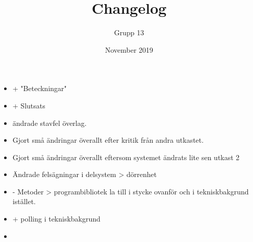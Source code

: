 \documentclass{article}
\title{Changelog}
\author{Grupp 13}
\date{November 2019}
\begin{document}
\maketitle
\begin{itemize}
    \item + "Beteckningar"
    \item + Slutsats
    \item ändrade stavfel överlag.
    \item Gjort små ändringar överallt efter kritik från andra utkastet. 
    \item Gjort små ändringar överallt eftersom systemet ändrats lite sen utkast 2
    \item Ändrade felsägningar i delsystem > dörrenhet
    \item - Metoder > programbibliotek la till i stycke ovanför och i tekniskbakgrund istället.
    \item + polling i tekniskbakgrund
    \item 
\end{itemize}
\end{document}
